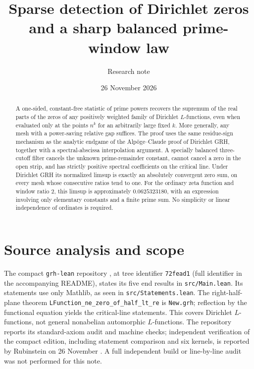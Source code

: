 \documentclass[11pt]{article}
\title{Sparse detection of Dirichlet zeros and a sharp balanced prime-window law}
\author{Research note}
\date{26 November 2026}
\theoremstyle{remark}\newtheorem{remark}[theorem]{Remark}
\begin{document}
\maketitle
\begin{abstract}
A one-sided, constant-free statistic of prime powers recovers the supremum of the real parts of the zeros of any positively weighted family of Dirichlet $L$-functions, even when evaluated only at the points $n^k$ for an arbitrarily large fixed $k$. More generally, any mesh with a power-saving relative gap suffices. The proof uses the same residue-sign mechanism as the analytic endgame of the Alp\"oge--Claude proof of Dirichlet GRH, together with a spectral-abscissa interpolation argument. A specially balanced three-cutoff filter cancels the unknown prime-remainder constant, cannot cancel a zero in the open strip, and has strictly positive spectral coefficients on the critical line. Under Dirichlet GRH its normalized limsup is exactly an absolutely convergent zero sum, on every mesh whose consecutive ratios tend to one. For the ordinary zeta function and window ratio $2$, this limsup is approximately $0.0625323180$, with an expression involving only elementary constants and a finite prime sum. No simplicity or linear independence of ordinates is required.
\end{abstract}

\section{Source analysis and scope}
The compact \texttt{grh-lean} repository \cite{repo}, at tree identifier \texttt{72fead1} (full identifier in the accompanying README), states its five end results in \nolinkurl{src/Main.lean}. Its statements use only Mathlib, as seen in \nolinkurl{src/Statements.lean}. The right-half-plane theorem \nolinkurl{LFunction_ne_zero_of_half_lt_re} is \texttt{New.grh}; reflection by the functional equation yields the critical-line statements. This covers Dirichlet $L$-functions, not general nonabelian automorphic $L$-functions. The repository reports its standard-axiom audit and machine checks; independent verification of the compact edition, including statement comparison and six kernels, is reported by Rubinstein on 26 November \cite{rubinstein}. A full independent build or line-by-line audit was not performed for this note.
\end{document}
